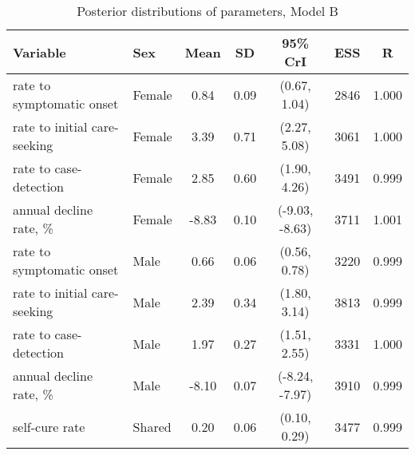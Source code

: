 \begin{table}[h]

\caption{\label{tab:}Posterior distributions of parameters, Model B}
\centering
\begin{tabular}[t]{llccccc}
\toprule
Variable & Sex & Mean & SD & 95\% CrI & ESS & \^{R}\\
\midrule
rate to symptomatic onset & Female & 0.84 & 0.09 & (0.67, 1.04) & 2846 & 1.000\\
rate to initial care-seeking & Female & 3.39 & 0.71 & (2.27, 5.08) & 3061 & 1.000\\
rate to case-detection & Female & 2.85 & 0.60 & (1.90, 4.26) & 3491 & 0.999\\
annual decline rate, \% & Female & -8.83 & 0.10 & (-9.03, -8.63) & 3711 & 1.001\\
\addlinespace
rate to symptomatic onset & Male & 0.66 & 0.06 & (0.56, 0.78) & 3220 & 0.999\\
rate to initial care-seeking & Male & 2.39 & 0.34 & (1.80, 3.14) & 3813 & 0.999\\
rate to case-detection & Male & 1.97 & 0.27 & (1.51, 2.55) & 3331 & 1.000\\
annual decline rate, \% & Male & -8.10 & 0.07 & (-8.24, -7.97) & 3910 & 0.999\\
\addlinespace
self-cure rate & Shared & 0.20 & 0.06 & (0.10, 0.29) & 3477 & 0.999\\
\bottomrule
\end{tabular}
\end{table}
